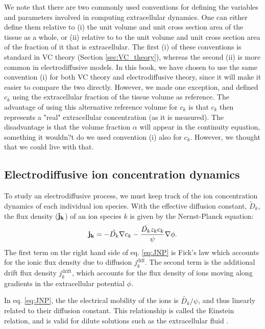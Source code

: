 We note that there are two commonly used conventions for defining the variables and parameters involved in computing extracellular dynamics. One can either define them relative to (i) the unit volume and unit cross section area of the tissue as a whole, or (ii) relative to to the unit volume and unit cross section area of the fraction of it that is extracellular. The first (i) of these conventions is standard in VC theory (Section \ref{sec:VC_theory}), whereas the second (ii) is more common in electrodiffusive models. In this book, we have chosen to use the same convention (i) for both VC theory and electrodiffusive theory, since it will make it easier to compare the two directly. However, we made one exception, and defined $c_k$ using the extracellular fraction of the tissue volume as reference. The advantage of using this alternative reference volume for $c_k$ is that $c_k$ then represents a "real" extracellular concentration (as it is measured). The disadvantage is that the volume fraction $\alpha$ will appear in the continuity equation, something it wouldn?t do we used convention (i) also for $c_k$. However, we thought that we could live with that.


\subsection{Electrodiffusive ion concentration dynamics}
To study an electrodiffusive process, we must keep track of the ion concentration dynamics of each individual ion species. 
With the effective diffusion constant, $\tilde{D}_k$, the flux density (${\bf j_k}$) of an ion species $k$ is given by the Nernst-Planck equation:
\begin{equation}
{\bf j_k} = - \tilde{D_k} {\bf \nabla} c_{k} - \frac{\tilde{D_k} z_k c_k}{\psi} {\bf \nabla} \phi.
\label{eq:JNP}
\end{equation}
The first term on the right hand side of eq. \ref{eq:JNP} is Fick's law which accounts for the ionic flux density due to diffusion $j_{k}^\text{diff}$. The second term is the additional drift flux density $j_{k}^\text{drift}$, which accounts for the flux density of ions moving along gradients in the extracellular potential $\phi$.

In eq. \ref{eq:JNP}, the the electrical mobility of the ions is $\tilde{D_k}/\psi$, and thus linearly related to their diffusion constant. This relationship is called the Einstein relation, and is valid for dilute solutions such as the extracellular fluid \cite{Grodzinsky2011} . 

